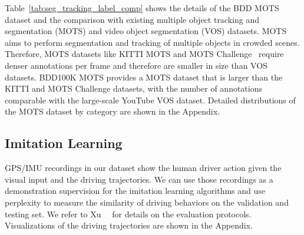 Table~\ref{tab:seg_tracking_label_comp} shows the details of the BDD MOTS dataset and the comparison with existing multiple object tracking and segmentation (MOTS) and video object segmentation (VOS) datasets. MOTS aims to perform segmentation and tracking of multiple objects in crowded scenes. Therefore, MOTS datasets like KITTI MOTS and MOTS Challenge~\cite{mots} require denser annotations per frame and therefore are smaller in size than VOS datasets. BDD100K MOTS provides a MOTS dataset that is larger than the KITTI and MOTS Challenge datasets, with the number of annotations comparable with the large-scale YouTube VOS \cite{ytvos} dataset. Detailed distributions of the MOTS dataset by category are shown in the Appendix.

\subsection{Imitation Learning}

GPS/IMU recordings in our dataset show the human driver action given the visual input and the driving trajectories. We can use those recordings as a demonstration supervision for the imitation learning algorithms and use perplexity to measure the similarity of driving behaviors on the validation and testing set. We refer to Xu~\etal~\cite{xu2017end} for details on the evaluation protocols. Visualizations of the driving trajectories are shown in the Appendix.